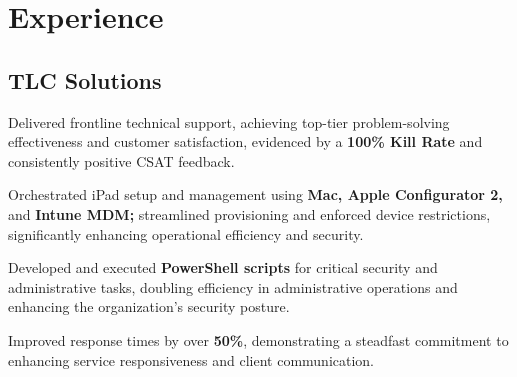 \documentclass[]{pratham-resume-openfont}
\begin{document}
\hfill
\begin{minipage}[t]{0.65\textwidth} 


\section{Experience}

\subsection{TLC Solutions}
\vspace{\topsep} %
\begin{tightemize}
\item Delivered frontline technical support, achieving top-tier problem-solving effectiveness and customer satisfaction, evidenced by a {\bf 100\% Kill Rate} and consistently positive CSAT feedback.
\item Orchestrated iPad setup and management using {\bf Mac, Apple Configurator 2,} and {\bf Intune MDM;} streamlined provisioning and enforced device restrictions, significantly enhancing operational efficiency and security.
\item Developed and executed {\bf PowerShell scripts} for critical security and administrative tasks, doubling efficiency in administrative operations and enhancing the organization's security posture.
\item Improved response times by over {\bf 50\%}, demonstrating a steadfast commitment to enhancing service responsiveness and client communication.
\end{tightemize}
\sectionsep


\end{minipage}
\end{document}
